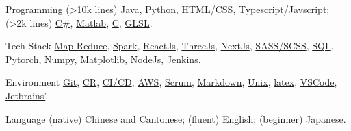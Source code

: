 
\begin{cvskills}
  \cvskill
    {Programming}
    {(>10k lines) \href{https://www.java.com/en/}{Java}, \href{https://www.python.org/}{Python}, \href{https://developer.mozilla.org/en-US/docs/Glossary/HTML5}{HTML}/\href{https://developer.mozilla.org/en-US/docs/Web/CSS}{CSS}, \href{https://www.javascript.com/}{Typescript/Javscript}; (>2k lines) \href{https://learn.microsoft.com/en-us/dotnet/csharp/tour-of-csharp/}{C\#}, \href{https://uk.mathworks.com/products/matlab.html}{Matlab}, \href{https://en.wikipedia.org/wiki/C_(programming_language)}{C}, \href{https://www.khronos.org/opengl/wiki/OpenGL_Shading_Language}{GLSL}.}

  \cvskill
    {Tech Stack} %
    {\href{https://en.wikipedia.org/wiki/MapReduce}{Map Reduce}, \href{https://spark.apache.org/}{Spark}, \href{https://reactjs.org/}{ReactJs}, \href{https://threejs.org/}{ThreeJs}, \href{https://nextjs.org/}{NextJs}, \href{https://sass-lang.com/}{SASS/SCSS}, \href{https://en.wikipedia.org/wiki/SQL}{SQL}, \href{https://pytorch.org/}{Pytorch}, \href{https://numpy.org/}{Numpy}, \href{https://matplotlib.org/}{Matplotlib}, \href{https://nodejs.org/en/}{NodeJs}, \href{https://www.jenkins.io/}{Jenkins}.}  %



  \cvskill
    {Environment} %
    {\href{https://git-scm.com/}{Git}, \href{https://en.wikipedia.org/wiki/Code_review}{CR}, \href{https://www.redhat.com/en/topics/devops/what-is-ci-cd}{CI/CD}, \href{https://aws.amazon.com/}{AWS}, \href{https://www.scrum.org/resources/what-is-scrum}{Scrum}, \href{https://en.wikipedia.org/wiki/Markdown}{Markdown}, \href{https://en.wikipedia.org/wiki/Unix}{Unix}, \href{https://www.latex-project.org/}{latex}, \href{https://code.visualstudio.com/}{VSCode}, \href{https://www.jetbrains.com/}{Jetbrains'}.}

  \cvskill
    {Language}
    {(native) Chinese and Cantonese; (fluent) English; (beginner) Japanese.}

  
\end{cvskills}
